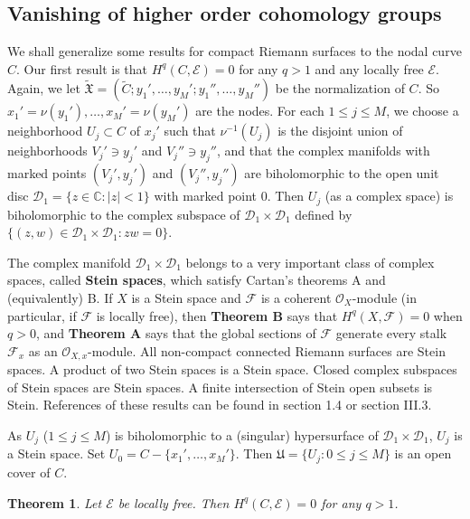 \documentclass[12pt,b5paper,notitlepage]{report}
\theoremstyle{definition}
\theoremstyle{plain}
\newtheorem{thm}[df]{Theorem}
\newcommand{\fk}{\mathfrak}
\newcommand{\mc}{\mathcal}
\newcommand{\wtd}{\widetilde}
\newcommand{\scr}{\mathscr}
\numberwithin{equation}{section}
\begin{document}
\subsection*{Vanishing of higher order cohomology groups}

We shall generalize some results for compact Riemann surfaces to the nodal curve $C$. Our first result is that $H^q(C,\scr E)=0$ for any $q>1$ and any locally free $\scr E$. Again, we let $\wtd{\fk X}=(\wtd C;y_1',\dots,y_M';y_1'',\dots,y_M'')$ be the normalization of $C$. So $x_1'=\nu(y_1'),\dots,x_M'=\nu(y_M')$ are the nodes. For each $1\leq j\leq M$, we choose a neighborhood $U_j\subset C$ of $x_j'$ such that $\nu^{-1}(U_j)$ is the disjoint union of neighborhoods $V_j'\ni y_j'$ and $V_j''\ni y_j''$, and that the complex manifolds with marked points $(V_j',y_j')$ and $(V_j'',y_j'')$ are biholomorphic to the open unit disc $\mc D_1=\{z\in\mathbb C:|z|<1 \}$ with marked point $0$. Then $U_j$ (as a complex space) is biholomorphic to the complex subspace of $\mc D_1\times \mc D_1$ defined by $\{(z,w)\in \mc D_1\times \mc D_1:zw=0\}$. 

The complex manifold $\mc D_1\times \mc D_1$ belongs to a very important class of complex spaces, called \textbf{Stein spaces}, which satisfy Cartan's theorems A and (equivalently) B. If $X$ is a Stein space and $\scr F$ is a coherent $\scr O_X$-module (in particular, if $\scr F$ is  locally free), then \textbf{Theorem B} says that $H^q(X,\scr F)=0$ when $q>0$, and \textbf{Theorem A} says that the global sections of $\scr F$ generate every stalk $\scr F_x$ as an $\scr O_{X,x}$-module.  All non-compact connected Riemann surfaces are Stein spaces. A  product  of two Stein spaces is a Stein space. Closed complex subspaces of Stein spaces are Stein spaces. A finite intersection of Stein open subsets is Stein. References of these results can be found in \cite{GR84} section 1.4 or \cite{GPR94} section III.3. 

As $U_j$ ($1\leq j\leq M$) is biholomorphic to a (singular) hypersurface of $\mc D_1\times \mc D_1$, $U_j$ is a Stein space. Set $U_0=C-\{x_1',\dots,x_M'\}$. Then $\fk U=\{U_j:0\leq j\leq M \}$ is an open cover of $C$.

\begin{thm}\label{lb7}
Let $\scr E$ be locally free. Then $H^q(C,\scr E)=0$ for any $q>1$.
\end{thm}
\end{document}
